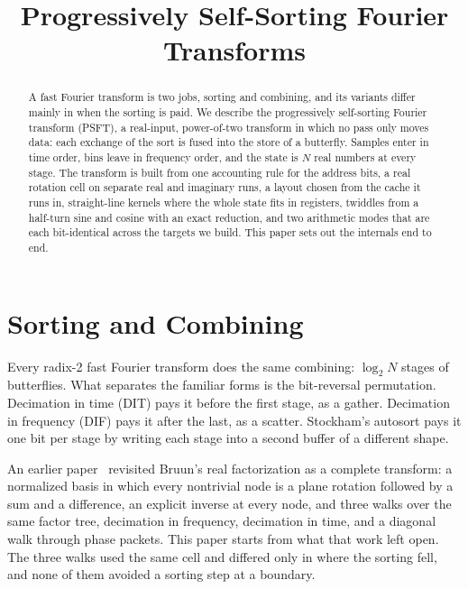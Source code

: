 \documentclass[conference]{IEEEtran}
\begin{document}
\title{Progressively Self-Sorting Fourier Transforms}
\author{}
\maketitle

\begin{abstract}
A fast Fourier transform is two jobs, sorting and combining, and its variants differ mainly in when the sorting is paid.
We describe the progressively self-sorting Fourier transform (PSFT), a real-input, power-of-two transform in which no pass only moves data: each exchange of the sort is fused into the store of a butterfly.
Samples enter in time order, bins leave in frequency order, and the state is $N$ real numbers at every stage.
The transform is built from one accounting rule for the address bits, a real rotation cell on separate real and imaginary runs, a layout chosen from the cache it runs in, straight-line kernels where the whole state fits in registers, twiddles from a half-turn sine and cosine with an exact reduction, and two arithmetic modes that are each bit-identical across the targets we build.
This paper sets out the internals end to end.
\end{abstract}

\section{Sorting and Combining}

Every radix-2 fast Fourier transform does the same combining: $\log_2 N$ stages of butterflies.
What separates the familiar forms is the bit-reversal permutation.
Decimation in time (DIT) pays it before the first stage, as a gather.
Decimation in frequency (DIF) pays it after the last, as a scatter.
Stockham's autosort pays it one bit per stage by writing each stage into a second buffer of a different shape.

An earlier paper~\cite{obr} revisited Bruun's real factorization as a complete transform: a normalized basis in which every nontrivial node is a plane rotation followed by a sum and a difference, an explicit inverse at every node, and three walks over the same factor tree, decimation in frequency, decimation in time, and a diagonal walk through phase packets.
This paper starts from what that work left open.
The three walks used the same cell and differed only in where the sorting fell, and none of them avoided a sorting step at a boundary.
\end{document}

